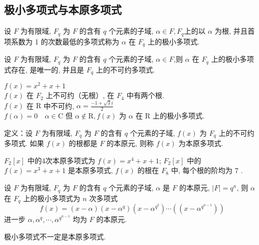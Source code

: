 \subsection{极小多项式与本原多项式}
\begin{definition}
    设 $ F $ 为有限域, $ F_{q} $ 为 $ F $ 的含有 $ q $ 个元素的子域, $ \alpha \in F, F_{q} $上的以 $ \alpha $ 为根, 并且首项系数为 1 的次数最低的多项式称为 $ \alpha $ 在 $ F_{q} $ 上的极小多项式.
\end{definition}

\begin{theorem}
    设 $ F $ 为有限域, $ F_{q} $ 为 $ F $ 的含有 $ q $ 个元素的子域, $ \alpha \in F $,则 $ \alpha $ 在 $ F_{q} $ 上的极小多项式存在, 是唯一的, 并且是 $ F_{q} $ 上的不可约多项式.
\end{theorem}

\begin{example}
     $ f(x)=x^{2}+x+1 $\\
$ f(x) $ 在 $ F_{2} $ 上不可约（无根）, 在 $ F_{4} $ 中有两个根.\\
$ f(x) $ 在 $ \mathrm{R} $ 中不可约, $ \alpha=\frac{-1+\sqrt{3} i}{2} $\\
$ f(\alpha)=0 \quad \alpha \in \mathrm{C} $ 但 $ \alpha \notin \mathrm{R}, f(x) $ 为 $ \alpha $ 在 $ \mathrm{R} $ 上的极小多项式.
\end{example}

\begin{definition}
    
定义：设 $ F $ 为有限域, $ F_{q} $ 为 $ F $ 的含有 $ q $ 个元素的子域, $ f(x) $ 为 $ F_{q} $ 上的不可约多项式. 如果 $ f(x) $ 的根都是 $ F $ 的本原元, 则称 $ f(x) $ 为本原多项式.
\end{definition}

\begin{example}
    $ F_{2}[x] $ 中的4次本原多项式为 $ f(x)=x^{4}+x+1 $; $ F_{2}[x] $ 中的 $ f(x)=x^{3}+x+1 $ 是本原多项式, $ f(x) $ 的根在 $ F_{8} $ 中, 每个根的阶均为 7 .
\end{example}

\begin{theorem}
    设 $ F $ 为有限域, $ F_{q} $ 为 $ F $ 的含有 $ q $ 个元素的子域, $ \alpha $ 是 $ F $ 的本原元, $ |F|=q^{n} $, 则 $ \alpha $ 在 $ F_{q} $ 上的极小多项式为 $ n $ 次多项式
$$
f(x)=(x-\alpha)\left(x-\alpha^{q}\right)\left(x-\alpha^{q^{2}}\right) \cdots\left(\left(x-\alpha^{q^{n-1}}\right)\right)
$$
进一步 $ \alpha, \alpha^{q}, \cdots, \alpha^{q^{n-1}} $ 均为 $ F $ 的本原元.
\end{theorem}
\begin{remark}
    极小多项式不一定是本原多项式.
\end{remark}

